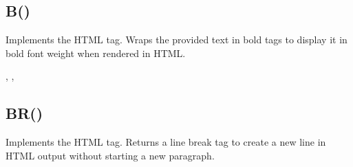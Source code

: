 \documentclass[letterpaper,10pt,english]{sphinxmanual}
\begin{document}
\ignorespaces 

\subsection{B()}
\label{\detokenize{reference/html:b}}\label{\detokenize{reference/html:index-0}}
\sphinxAtStartPar
{}

\sphinxAtStartPar
Implements the HTML  tag. Wraps the provided text in bold tags to display it in bold font weight when rendered in HTML.

\sphinxAtStartPar
{}

\begin{sphinxVerbatim}[commandchars=\\\{\}]
\end{sphinxVerbatim}

\sphinxAtStartPar
{}

\begin{sphinxVerbatim}[commandchars=\\\{\}]
\end{sphinxVerbatim}

\sphinxAtStartPar
{}

\sphinxAtStartPar
{}, , 

\ignorespaces 

\subsection{BR()}
\label{\detokenize{reference/html:br}}\label{\detokenize{reference/html:index-1}}
\sphinxAtStartPar
{}

\sphinxAtStartPar
Implements the HTML  tag. Returns a line break tag to create a new line in HTML output without starting a new paragraph.
\end{document}
